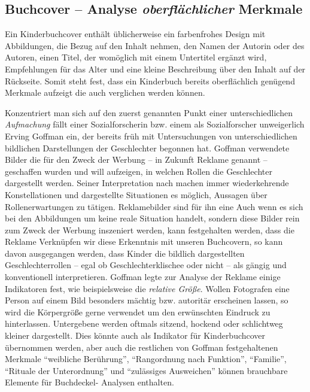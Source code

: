   \subsection{Buchcover -- Analyse \emph{oberflächlicher} Merkmale}

    Ein Kinderbuchcover enthält üblicherweise ein farbenfrohes Design mit
    Abbildungen, die Bezug auf den Inhalt nehmen, den Namen der Autorin oder des
    Autoren, einen Titel, der womöglich mit einem Untertitel ergänzt wird,
    Empfehlungen für das Alter und eine kleine Beschreibung über den Inhalt auf
    der Rückseite. Somit steht fest, dass ein Kinderbuch bereits oberflächlich
    genügend Merkmale aufzeigt die auch verglichen werden können.

    Konzentriert man sich auf den zuerst genannten Punkt einer unterschiedlichen
    \emph{Aufmachung} fällt einer Sozialforscherin bzw. einem als Sozialforscher
    unweigerlich Erving Goffman ein, der bereits früh mit Untersuchungen von
    unterschiedlichen bildlichen Darstellungen der Geschlechter begonnen hat.
    Goffman verwendete Bilder die für den Zweck der Werbung -- in Zukunft
    Reklame genannt -- geschaffen wurden und will aufzeigen, in welchen Rollen
    die Geschlechter dargestellt werden. Seiner Interpretation nach machen immer
    wiederkehrende Konstellationen und dargestellte Situationen es möglich,
    Aussagen über Rollenerwartungen zu tätigen. Reklamebilder sind für ihn eine
     Auch wenn
    es sich bei den Abbildungen um keine reale Situation handelt, sondern diese
    Bilder rein zum Zweck der Werbung inszeniert werden, kann festgehalten
    werden, dass die Reklame  Verknüpfen wir diese Erkenntnis mit unseren Buchcovern, so kann davon
    ausgegangen werden, dass Kinder die bildlich dargestellten
    Geschlechterrollen -- egal ob Geschlechterklischee oder nicht -- als gängig
    und konventionell interpretieren. Goffman legte zur Analyse der Reklame
    einige Indikatoren fest, wie beispielsweise die \emph{relative Größe}.
    Wollen Fotografen eine Person auf einem Bild besonders mächtig bzw.
    autoritär erscheinen lassen, so wird die Körpergröße gerne verwendet um den
    erwünschten Eindruck zu hinterlassen. Untergebene werden oftmals sitzend,
    hockend oder schlichtweg kleiner dargestellt. Dies könnte auch als Indikator
    für Kinderbuchcover übernommen werden, aber auch die restlichen von Goffman
    festgehaltenen Merkmale \enquote{weibliche Berührung}, \enquote{Rangordnung
    nach Funktion}, \enquote{Familie}, \enquote{Rituale der Unterordnung} und
    \enquote{zulässiges Ausweichen} können brauchbare Elemente für Buchdeckel-
    Analysen enthalten.

